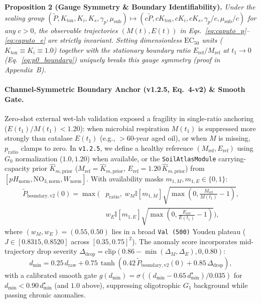 \documentclass[10pt,twocolumn,a4paper]{article}
\begin{document}
\noindent\textbf{Proposition 2 (Gauge Symmetry \& Boundary Identifiability).} \emph{Under the scaling group $(\tilde{P}, K_{\text{tox}}, K_i, K_s, \gamma_p, \mu_{\text{sub}}) \mapsto (c\tilde{P}, cK_{\text{tox}}, cK_i, cK_s, \gamma_p/c, \mu_{\text{sub}}/c)$ for any $c > 0$, the observable trajectories $(M(t), E(t))$ in Eqs.~\eqref{eq:caputo_p}--\eqref{eq:caputo_e} are strictly invariant. Setting dimensionless $\text{EC}_{50}$ units ($K_{\text{tox}} \equiv K_i \equiv 1.0$) together with the stationary boundary ratio $E_{\text{ref}}/M_{\text{ref}}$ at $t_1 \to 0$ (Eq.~\eqref{eq:p0_boundary}) uniquely breaks this gauge symmetry (proof in Appendix~B).}


\paragraph{Channel-Symmetric Boundary Anchor (v1.2.5, Eq.~4-v2) \& Smooth Gate.}
Zero-shot external wet-lab validation exposed a fragility in single-ratio anchoring ($E(t_1)/M(t_1) < 1.20$): when microbial respiration $M(t_1)$ is suppressed more strongly than catalase $E(t_1)$ (e.g., $>60$-year aged oil), or when $M$ is missing, $p_{\mathrm{ratio}}$ clamps to zero. In \texttt{v1.2.5}, we define a healthy reference $(M_{\mathrm{ref}}, E_{\mathrm{ref}})$ using $G_0$ normalization ($1.0, 1.20$) when available, or the \texttt{SoilAtlasModule} carrying-capacity prior $\hat{K}_{m,\mathrm{prior}}$ ($M_{\mathrm{ref}}=\hat{K}_{m,\mathrm{prior}}$, $E_{\mathrm{ref}}=1.20\,\hat{K}_{m,\mathrm{prior}}$) from $[pH_{\mathrm{norm}}, \mathrm{NO}_{3,\mathrm{norm}}, W_{\mathrm{norm}}]$. With availability masks $m_{1,M}, m_{1,E} \in \{0,1\}$:
\begin{equation}
\begin{aligned}
\tilde{P}_{\mathrm{boundary,v2}}(0) = \max\Big(& p_{\mathrm{ratio}},\; w_M\mathbb{I}[m_{1,M}]\sqrt{\max\!\left(0, \tfrac{M_{\mathrm{ref}}}{M(t_1)}-1\right)}, \\
& w_E\mathbb{I}[m_{1,E}]\sqrt{\max\!\left(0, \tfrac{E_{\mathrm{ref}}}{E(t_1)}-1\right)}\Big),
\end{aligned}
\end{equation}
where $(w_M, w_E) = (0.55, 0.50)$ lies in a broad \texttt{Val (500)} Youden plateau ($J \in [0.8315, 0.8520]$ across $[0.35, 0.75]^2$). The anomaly score incorporates mid-trajectory drop severity $\Delta_{\mathrm{drop}} = \mathrm{clip}(0.86 - \min(\Delta_M, \Delta_E), 0, 0.80)$:
\begin{equation}
d_{\min} = 0.25\,d_{\mathrm{raw}} + 0.75\,\tanh\!\left(0.42\,\tilde{P}_{\mathrm{boundary,v2}}(0) + 0.85\,\Delta_{\mathrm{drop}}\right),
\end{equation}
with a calibrated smooth gate $g(d_{\min}) = \sigma((d_{\min} - 0.65\,d^\star_{\min})/0.035)$ for $d_{\min} < 0.90\,d^\star_{\min}$ (and $1.0$ above), suppressing oligotrophic $G_1$ background while passing chronic anomalies.
\end{document}
